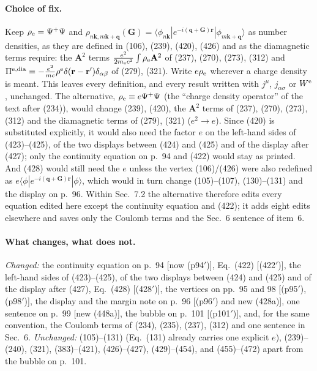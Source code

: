 \paragraph{Choice of fix.}
Keep $\rho_{\rm e}=\Psi^+\Psi$ and
$\rho_{n\mathbf k,m\mathbf k+\mathbf q}(\mathbf G)=\langle\phi_{n\mathbf k}|e^{-i(\mathbf q+\mathbf G)\mathbf r}|\phi_{m\mathbf k+\mathbf q}\rangle$
as number densities, as they are defined in (106), (239), (420), (426) and as the diamagnetic terms
require: the $\mathbf A^2$ terms $\frac{e^2}{2m_{\rm e}c^2}\int\rho_{\rm e}\mathbf A^2$ of (237), (270), (273),
(312) and $\Pi^{\rm e,dia}=-\frac{e^2}{mc}\rho^{\rm e}\delta(\mathbf r-\mathbf r')\delta_{\alpha\beta}$ of (279), (321).
Write $e\rho_{\rm e}$ wherever a charge density is meant. This leaves every definition, and every result
written with $j^\mu$, $j_{\alpha\sigma}$ or $W^{\rm e}$, unchanged. The alternative, $\rho_{\rm e}\equiv e\Psi^+\Psi$
(the ``charge density operator'' of the text after (234)), would change (239), (420), the $\mathbf A^2$
terms of (237), (270), (273), (312) and the diamagnetic terms of (279), (321) ($e^2\to e$). Since (420) is
substituted explicitly, it would also need the factor $e$ on the left-hand sides of (423)--(425), of the
two displays between (424) and (425) and of the display after (427); only the continuity equation on
p.~94 and (422) would stay as printed. And (428) would still need the $e$ unless the
vertex (106)/(426) were also redefined as $e\langle\phi|e^{-i(\mathbf q+\mathbf G)\mathbf r}|\phi\rangle$,
which would in turn change (105)--(107), (130)--(131) and the display on p.~96. Within Sec.~7.2 the
alternative therefore edits every equation edited here except the continuity equation and (422); it
adds eight edits elsewhere and saves only the Coulomb terms and the Sec.~6 sentence of item~6.

\paragraph{What changes, what does not.}
\emph{Changed:} the continuity equation on p.~94 [now (p94$'$)], Eq.~(422) [(422$'$)], the left-hand
sides of (423)--(425), of the two displays between (424) and (425) and of the display after (427),
Eq.~(428) [(428$'$)], the vertices on pp.~95 and
98 [(p95$'$), (p98$'$)], the display and the margin note on p.~96 [(p96$'$) and new (428a)], one
sentence on p.~99 [new (448a)], the bubble on p.~101 [(p101$'$)], and, for the same convention, the
Coulomb terms of (234), (235), (237), (312) and one sentence in Sec.~6. \emph{Unchanged:} (105)--(131)
(Eq.~(131) already carries one explicit $e$), (239)--(240), (321), (383)--(421), (426)--(427),
(429)--(454), and (455)--(472) apart from the bubble on p.~101.

